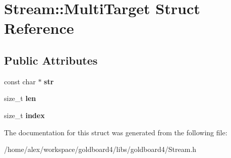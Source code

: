 \hypertarget{struct_stream_1_1_multi_target}{}\section{Stream\+:\+:Multi\+Target Struct Reference}
\label{struct_stream_1_1_multi_target}
\subsection*{Public Attributes}
\begin{DoxyCompactItemize}
\item 
const char $\ast$ {\bfseries str}\hypertarget{struct_stream_1_1_multi_target_a2966d33f06cd1f5db43702f08c6e74c7}{}\label{struct_stream_1_1_multi_target_a2966d33f06cd1f5db43702f08c6e74c7}

\item 
size\+\_\+t {\bfseries len}\hypertarget{struct_stream_1_1_multi_target_ae0ffba42be1143525f624242bf607a63}{}\label{struct_stream_1_1_multi_target_ae0ffba42be1143525f624242bf607a63}

\item 
size\+\_\+t {\bfseries index}\hypertarget{struct_stream_1_1_multi_target_a33cced896eb2dbabbeb7dd5dfa019e51}{}\label{struct_stream_1_1_multi_target_a33cced896eb2dbabbeb7dd5dfa019e51}

\end{DoxyCompactItemize}


The documentation for this struct was generated from the following file\+:\begin{DoxyCompactItemize}
\item 
/home/alex/workspace/goldboard4/libs/goldboard4/Stream.\+h\end{DoxyCompactItemize}
